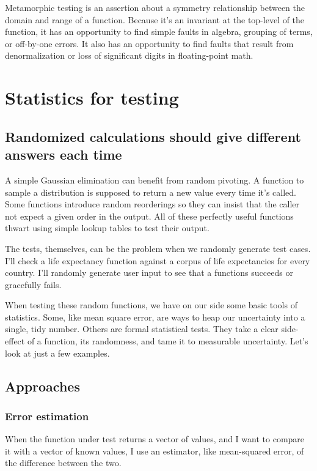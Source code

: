 \documentclass[fleqn,10pt]{olplainarticle}
\begin{document}
Metamorphic testing is an assertion about a symmetry relationship between
the domain and range of a function. Because it's an invariant at the top-level
of the function, it has an opportunity to find simple faults in algebra,
grouping of terms, or off-by-one errors. It also has an opportunity to
find faults that result from denormalization or loss of significant digits
in floating-point math.



\section{Statistics for testing}\label{sec:statistical}

\subsection{Randomized calculations should give different answers each time}

A simple Gaussian elimination can benefit from random pivoting.
A function to sample a distribution is supposed to return a new value
every time it's called.
Some functions introduce random reorderings
so they can insist that the caller not expect a given order
in the output. All of these perfectly useful functions
thwart using simple lookup tables to test their output.

The tests, themselves, can be the problem when we randomly
generate test cases. I'll check
a life expectancy function against a corpus of life expectancies
for every country. I'll randomly generate user input
to see that a functions succeeds or gracefully fails.

When testing these random functions,
we have on our side some basic tools
of statistics. Some, like mean square error, are ways
to heap our uncertainty into a single, tidy number.
Others are formal statistical
tests. They take a clear side-effect of a function,
its randomness, and tame it to measurable uncertainty.
Let's look at just a few examples.

\subsection{Approaches}

\subsubsection{Error estimation}
When the function under test returns a vector of values,
and I want to compare it with a vector of known values,
I use an estimator, like mean-squared error, of the difference
between the two.
\end{document}
